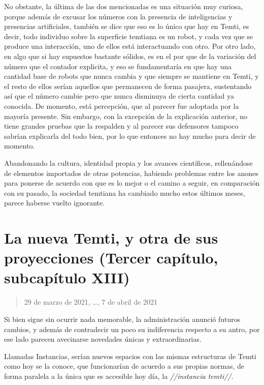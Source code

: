 \documentclass[
  spanish,
]{book}
\begin{document}
No obstante, la última de las dos mencionadas es una situación muy curiosa, porque además de excusar los números con la presencia de inteligencias y presencias artificiales, también se dice que eso es lo único que hay en Temti, es decir, todo individuo sobre la superficie temtiana es un robot, y cada vez que se produce una interacción, uno de ellos está interactuando con otro.
Por otro lado, en algo que si hay supuestos bastante sólidos, es en el por que de la variación del número que el contador explicita, y eso se fundamentaría en que hay una cantidad base de robots que nunca cambia y que siempre se mantiene en Temti, y el resto de ellos serían aquellos que permanecen de forma pasajera, sustentando así que el número cambie pero que nunca disminuya de cierta cantidad ya conocida.
De momento, está percepción, que al parecer fue adoptada por la mayoría presente. Sin embargo, con la excepción de la explicación anterior, no tiene grandes pruebas que la respalden y al parecer sus defensores tampoco sabrían explicarla del todo bien, por lo que entonces no hay mucho para decir de momento.

Abandonando la cultura, identidad propia y los avances científicos, rellenándose de elementos importados de otras potencias, habiendo problemas entre los anones para ponerse de acuerdo con que es lo mejor o el camino a seguir, en comparación con su pasado, la sociedad temtiana ha cambiado mucho estos últimos meses, parece haberse vuelto ignorante.

\hypertarget{la-nueva-temti-y-otra-de-sus-proyecciones-tercer-capuxedtulo-subcapuxedtulo-xiii}{%
\section{La nueva Temti, y otra de sus proyecciones (Tercer capítulo, subcapítulo XIII)}\label{la-nueva-temti-y-otra-de-sus-proyecciones-tercer-capuxedtulo-subcapuxedtulo-xiii}}

\begin{quote}
29 de marzo de 2021, \ldots, 7 de abril de 2021
\end{quote}

Si bien sigue sin ocurrir nada memorable, la administración anunció futuros cambios, y además de contradecir un poco su indiferencia respecto a su antro, por ese lado parecen avecinarse novedades únicas y extraordinarias.

Llamadas Instancias, serían nuevos espacios con las mismas estructuras de Temti como hoy se la conoce, que funcionarían de acuerdo a sus propias normas, de forma paralela a la única que es accesible hoy día, la \emph{//instancia temti//}.
\end{document}
